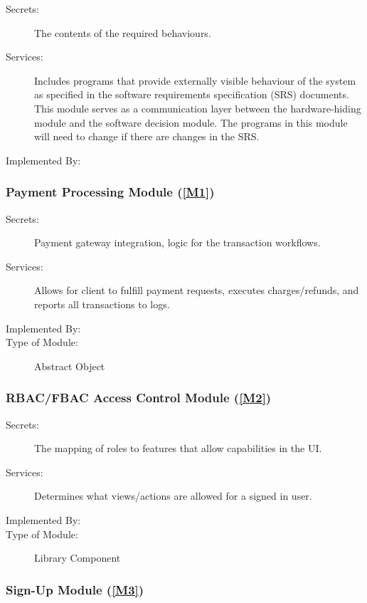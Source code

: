 \documentclass[12pt, titlepage]{article}
\begin{document}
\begin{description}
\item[Secrets:]The contents of the required behaviours.
\item[Services:]Includes programs that provide externally visible behaviour of
  the system as specified in the software requirements specification (SRS)
  documents. This module serves as a communication layer between the
  hardware-hiding module and the software decision module. The programs in this
  module will need to change if there are changes in the SRS.
\item[Implemented By:] 
\end{description}

\subsubsection{Payment Processing Module (\ref{M1})}

\begin{description}
\item[Secrets:] Payment gateway integration, logic for the transaction workflows.
\item[Services:] Allows for client to fulfill payment requests, executes charges/refunds, and reports all transactions to logs.
\item[Implemented By:] \progname{}
\item[Type of Module:] Abstract Object
\end{description}

\subsubsection{RBAC/FBAC Access Control Module (\ref{M2})}

\begin{description}
\item[Secrets:] The mapping of roles to features that allow capabilities in the UI.
\item[Services:] Determines what views/actions are allowed for a signed in user. 
\item[Implemented By:] \progname{}
\item[Type of Module:] Library Component
\end{description}

\subsubsection{Sign-Up Module (\ref{M3})}
\end{document}
